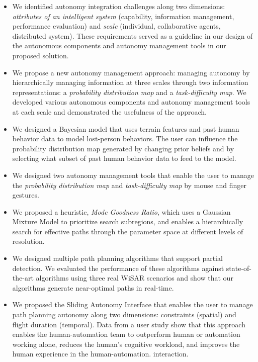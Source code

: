 \begin{itemize}
\item We identified autonomy integration challenges along two dimensions: \textit{attributes of an intelligent system} (capability, information management, performance evaluation) and \textit{scale} (individual, collaborative agents, distributed system). These requirements served as a guideline in our design of the autonomous components and autonomy management tools in our proposed solution.
\item We propose a new autonomy management approach: managing autonomy by hierarchically managing information at three scales through two information representations: a \textit{probability distribution map} and a \textit{task-difficulty map}. We developed various autonomous components and autonomy management tools at each scale and demonstrated the usefulness of the approach.
\item We designed a Bayesian model that uses terrain features and past human behavior data to model lost-person behaviors. The user can influence the probability distribution map generated by changing prior beliefs and by selecting what subset of past human behavior data to feed to the model.
\item We designed two autonomy management tools that enable the user to manage the \textit{probability distribution map} and \textit{task-difficulty map} by mouse and finger gestures.
\item We proposed a heuristic, \textit{Mode Goodness Ratio}, which uses a Gaussian Mixture Model to prioritize search subregions, and enables a hierarchically search for effective paths through the parameter space at different levels of resolution.
\item We designed multiple path planning algorithms that support partial detection. We evaluated the performance of these algorithms against state-of-the-art algorithms using three real WiSAR scenarios and show that our algorithms generate near-optimal paths in real-time.
\item We proposed the Sliding Autonomy Interface that enables the user to manage path planning autonomy along two dimensions: constraints (spatial) and flight duration (temporal). Data from a user study show that this approach enables the human-automation team to outperform human or automation working alone, reduces the human's cognitive workload, and improves the human experience in the human-automation. interaction.
\end{itemize}

